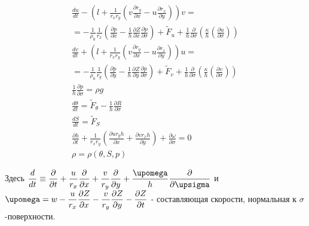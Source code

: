 	\begin{equation} \label{eq:inmsom/3} 
	\begin{array}{c} 
	\displaystyle{\frac{du}{dt} -\left(l+\frac{1}{r_{x} r_{y} } \left(v\frac{\partial r_{y} }{\partial x} -u\frac{\partial r_{x} }{\partial y} \right)\right)v=} \\
	\displaystyle{= -\frac{1}{\rho _{0} } \frac{1}{r_{x} } \left(\frac{\partial p}{\partial x} -\frac{1}{h} \frac{\partial Z}{\partial x} \frac{\partial p}{\partial \sigma } \right)+\tilde{F}_{u} +\frac{1}{h} \frac{\partial }{\partial \sigma } \left(\frac{\kappa }{h} \left(\frac{\partial u}{\partial \sigma } \right)\right)} \\
	
	\displaystyle{\frac{dv}{dt} +\left(l+\frac{1}{r_{x} r_{y} } \left(v\frac{\partial r_{y} }{\partial x} -u\frac{\partial r_{x} }{\partial y} \right)\right)u=} \\
	\displaystyle{= -\frac{1}{\rho _{0} } \frac{1}{r_{y} } \left(\frac{\partial p}{\partial y} -\frac{1}{h} \frac{\partial Z}{\partial y} \frac{\partial p}{\partial \sigma } \right)+\tilde{F}_{v} +\frac{1}{h} \frac{\partial }{\partial \sigma } \left(\frac{\kappa }{h} \left(\frac{\partial v}{\partial \sigma } \right)\right)} \\
	
	\displaystyle{\frac{1}{h} \frac{\partial p}{\partial \sigma } =\rho g} \\
	
	\displaystyle{\frac{d\theta }{dt} = \tilde{F}_{\theta } -\frac{1}{h} \frac{\partial R}{\partial \sigma } } \\
	
	\displaystyle{\frac{dS}{dt} = \tilde{F}_{S} } \\ 
	
	\displaystyle{\frac{\partial h}{\partial t} +\frac{1}{r_{x} r_{y} } \left(\frac{\partial ur_{y} h}{\partial x} +\frac{\partial vr_{x} h}{\partial y} \right)+\frac{\partial \omega }{\partial \sigma } =0} \\
	
	\displaystyle{\rho =\rho (\theta ,S,p)} 
	\end{array}
	\end{equation}
	
	Здесь  $\displaystyle{ \frac{d}{dt} \equiv \d{}{t} + \frac{u}{r_x} \d{}{x} + \frac{v}{r_y}\d{}{y} + \frac{\omega}{h}\d{}{\sigma} }$ и
	$\displaystyle{ \omega = w - \frac{u}{r_x}\d{Z}{x} - \frac{v}{r_y}\d{Z}{y} - \d{Z}{t} }$ - составляющая скорости, нормальная к $\sigma$-поверхности.
	
